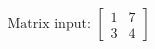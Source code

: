 \documentclass[preview]{standalone}
\begin{document}
\begin{align*}
\text{Matrix input: } \begin{bmatrix} 1 & 7 \\ 3 & 4 \end{bmatrix}
\end{align*}
\end{document}

